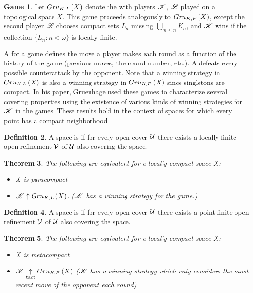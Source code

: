 \documentclass{amsart}
\newtheorem{theorem}{Theorem}[section]
\theoremstyle{definition}
\newtheorem{definition}[theorem]{Definition}
\newtheorem{game}[theorem]{Game}
\begin{document}
\begin{game}
  Let $Gru_{K,L}\left({X}\right)$ denote the 
  with players $\mathscr{K}$, $\mathscr{L}$ played on a topological space \(X\).
  This game proceeds analogously to
  $Gru_{K,P}\left({X}\right)$, except the second player $\mathscr{L}$ chooses compact sets $L_n$
  missing $\bigcup_{m\leq n}K_n$,
  and $\mathscr{K}$ wins if the collection $\{L_n:n<\omega\}$ is locally finite.
\end{game}

A  for a game defines the move a player makes each round as
a function of the history of the game (previous moves, the round number, etc.).
A  defeats every possible counterattack by the
opponent.
Note that a winning strategy in \(Gru_{K,L}\left({X}\right)\) is also a winning strategy
in \(Gru_{K,P}\left({X}\right)\) since singletons are compact.
In his paper, Gruenhage used these games to characterize several covering
properties using the existence of various kinds of winning strategies for
\(\mathscr{K}\) in the games. These results hold in the context of
 spaces for which every point has a compact neighborhood.

\begin{definition}
  A space is  if for every open cover $\mathcal{U}$ there exists a
  locally-finite open refinement $\mathcal{V}$ of $\mathcal{U}$ also covering the space.
\end{definition}

\begin{theorem}
  The following are equivalent for a locally compact space $X$:
    \begin{itemize}
      \item $X$ is paracompact
      \item $\mathscr{K} \uparrow Gru_{K,L}\left({X}\right)$. (\(\mathscr{K}\) has a winning strategy
      for the game.)
    \end{itemize}
\end{theorem}

\begin{definition}
  A space is  if for every open cover $\mathcal{U}$ there exists a
  point-finite open refinement $\mathcal{V}$ of $\mathcal{U}$ also covering the space.
\end{definition}

\begin{theorem}
  The following are equivalent for a locally compact space $X$:
    \begin{itemize}
      \item $X$ is metacompact
      \item $\mathscr{K} \underset{\text{tact}}{\uparrow} Gru_{K,P}\left({X}\right)$ (\(\mathscr{K}\) has a 
      winning strategy which only considers the most recent move of
      the opponent each round)
    \end{itemize}
\end{theorem}
\end{document}
